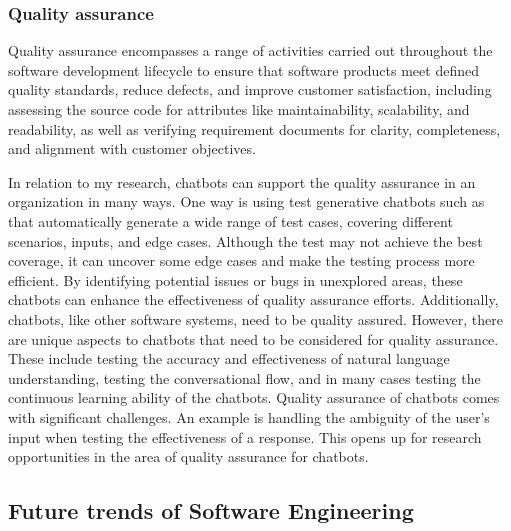 \documentclass[10pt, a4paper]{article}
\begin{document}
\subsubsection{Quality assurance}
Quality assurance encompasses a range of activities carried out throughout the software development lifecycle to ensure that software products meet defined quality standards, reduce defects, and improve customer satisfaction, including assessing the source code for attributes like maintainability, scalability, and readability, as well as verifying requirement documents for clarity, completeness, and alignment with customer objectives.

In relation to my research, chatbots can support the quality assurance in an organization in many ways. One way is using test generative chatbots such as \cite{lemieux2023codamosa} that 
automatically generate a wide range of test cases, covering different scenarios, inputs, and edge cases. Although the test may not achieve the best coverage, it can uncover some edge cases and make the testing process more efficient. By identifying potential issues or bugs in unexplored areas, these chatbots can enhance the effectiveness of quality assurance efforts.
Additionally, chatbots, like other software systems, need to be quality assured. However, there are unique aspects to chatbots that need to be considered for quality assurance. These include testing the accuracy and effectiveness of natural language understanding, testing the conversational flow, and in many cases testing the continuous learning ability of the chatbots. Quality assurance of chatbots comes with significant challenges. An example is handling the ambiguity of the user's input when testing the effectiveness of a response. This opens up for research opportunities in the area of quality assurance for chatbots.




\subsection{Future trends of Software Engineering}
\end{document}
